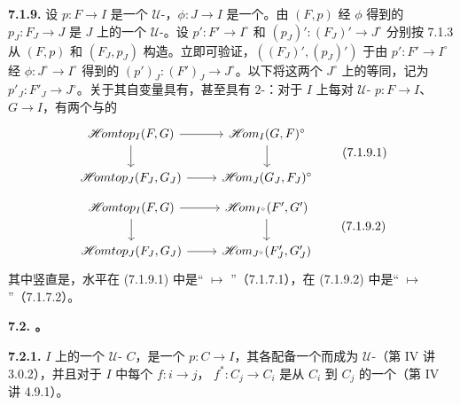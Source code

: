 \textbf{7.1.9.} 设 $p:F\to I$ 是一个 $\mathcal U$-，$\phi:J\to I$ 是一个。由 $(F,p)$ 经 $\phi$ 得到的 $p_J:F_J\to J$ 是 $J$ 上的一个 $\mathcal U$-。设 $p':F'\to I^\circ$ 和 $(p_J)':(F_J)'\to J^\circ$ 分别按 7.1.3 从 $(F,p)$ 和 $(F_J,p_J)$ 构造。立即可验证，$((F_J)',(p_J)')$ 于由 $p':F'\to I^\circ$ 经 $\phi:J^\circ\to I^\circ$ 得到的 $(p')_J:(F')_J\to J^\circ$。以下将这两个 $J^\circ$ 上的等同，记为 $p'_J:F'_J\to J^\circ$。关于其自变量具有，甚至具有 $2$-：对于 $I$ 上每对 $\mathcal U$- $p:F\to I$、$G\to I$，有两个与的
\[\begin{tikzcd}
\mathscr{H}\!omtop_I(F,G)\arrow[r]\arrow[d]&\mathscr{H}\!om_I(G,F)^\circ\arrow[d]\\
\mathscr{H}\!omtop_J(F_J,G_J)\arrow[r]&\mathscr{H}\!om_J(G_J,F_J)^\circ
\end{tikzcd}\tag{7.1.9.1}\]
\[\begin{tikzcd}
\mathscr{H}\!omtop_I(F,G)\arrow[r]\arrow[d]&\mathscr{H}\!om_{I^\circ}(F',G')\arrow[d]\\
\mathscr{H}\!omtop_J(F_J,G_J)\arrow[r]&\mathscr{H}\!om_{J^\circ}(F'_J,G'_J)
\end{tikzcd}\tag{7.1.9.2}\]
其中竖直是，水平在 (7.1.9.1) 中是“ $\mapsto$ ”（7.1.7.1），在 (7.1.9.2) 中是“ $\mapsto$ ”（7.1.7.2）。

\textbf{7.2. 。}

\textbf{7.2.1.}  $I$ 上的一个 $\mathcal U$- $C$，是一个 $p:C\to I$，其各配备一个而成为 $\mathcal U$-（第 IV 讲 3.0.2），并且对于 $I$ 中每个 $f:i\to j$， $f^*:C_j\to C_i$ 是从 $C_i$ 到 $C_j$ 的一个（第 IV 讲 4.9.1）。

